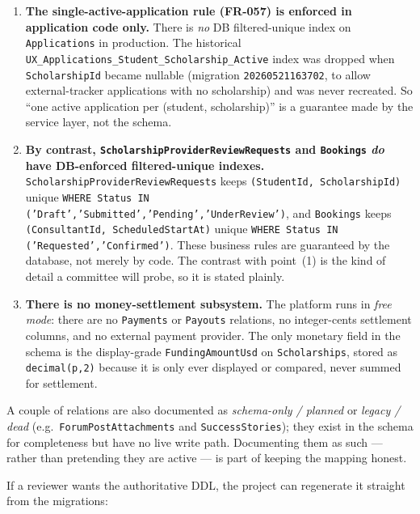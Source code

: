 \documentclass[11pt,a4paper]{article}
\begin{document}
\begin{enumerate}[leftmargin=1.6em]
  \item \textbf{The single-active-application rule (FR-057) is enforced in
        application code only.} There is \emph{no} DB filtered-unique index on
        \texttt{Applications} in production. The historical
        \texttt{UX\_Applications\_Student\_Scholarship\_Active} index was dropped
        when \texttt{ScholarshipId} became nullable (migration
        \texttt{20260521163702}, to allow external-tracker applications with no
        scholarship) and was never recreated. So ``one active application per
        (student, scholarship)'' is a guarantee made by the service layer, not
        the schema.

  \item \textbf{By contrast, \texttt{ScholarshipProviderReviewRequests} and
        \texttt{Bookings} \emph{do} have DB-enforced filtered-unique indexes.}
        \texttt{ScholarshipProviderReviewRequests} keeps
        \texttt{(StudentId, ScholarshipId)} unique \texttt{WHERE Status IN
        ('Draft','Submitted','Pending','UnderReview')}, and \texttt{Bookings}
        keeps \texttt{(ConsultantId, ScheduledStartAt)} unique \texttt{WHERE
        Status IN ('Requested','Confirmed')}. These business rules are
        guaranteed by the database, not merely by code. The contrast with
        point~(1) is the kind of detail a committee will probe, so it is stated
        plainly.

  \item \textbf{There is no money-settlement subsystem.} The platform runs in
        \emph{free mode}: there are no \texttt{Payments} or \texttt{Payouts}
        relations, no integer-cents settlement columns, and no external payment
        provider. The only monetary field in the schema is the display-grade
        \texttt{FundingAmountUsd} on \texttt{Scholarships}, stored as
        \texttt{decimal(p,2)} because it is only ever displayed or compared, never
        summed for settlement.
\end{enumerate}

A couple of relations are also documented as \emph{schema-only / planned} or
\emph{legacy / dead} (e.g.\ \texttt{ForumPostAttachments} and
\texttt{SuccessStories}); they exist in the schema for completeness but have no
live write path. Documenting them as such --- rather than pretending they are
active --- is part of keeping the mapping honest.

If a reviewer wants the authoritative DDL, the project can regenerate it straight
from the migrations:
\end{document}
